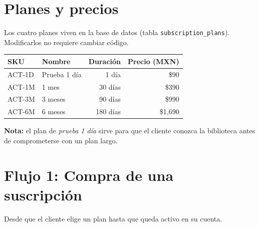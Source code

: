 \documentclass[11pt,a4paper]{article}
\begin{document}
\newpage
\section{Planes y precios}

Los cuatro planes viven en la base de datos (tabla \texttt{subscription\_plans}).
Modificarlos no requiere cambiar código.

\begin{center}
\begin{tabular}{@{}llrr@{}}
\toprule
\textbf{SKU} & \textbf{Nombre} & \textbf{Duración} & \textbf{Precio (MXN)} \\
\midrule
ACT-1D & Prueba 1 día & 1 día    & \$90 \\
ACT-1M & 1 mes        & 30 días  & \$390 \\
ACT-3M & 3 meses      & 90 días  & \$990 \\
ACT-6M & 6 meses      & 180 días & \$1{,}690 \\
\bottomrule
\end{tabular}
\end{center}

\noindent\textbf{Nota:} el plan de \emph{prueba 1 día} sirve para que el cliente
conozca la biblioteca antes de comprometerse con un plan largo.

\section{Flujo 1: Compra de una suscripción}

Desde que el cliente elige un plan hasta que queda activo en su cuenta.
\end{document}
